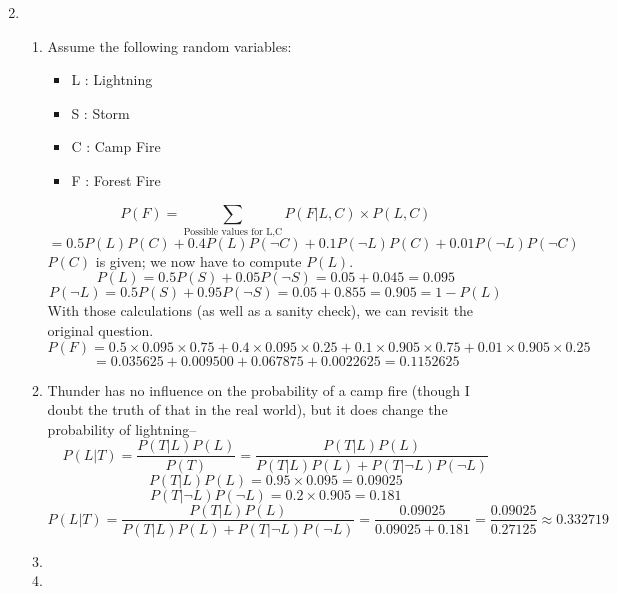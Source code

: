 \documentclass{article}
\begin{document}
\fancyhfoffset[L]{0cm}
\fancyhfoffset[R]{0cm}
\rhead{\today}

\begin{enumerate}
    \setcounter{enumi}{1}
    \item
    \begin{enumerate}
        \item
            Assume the following random variables:\\
            \begin{itemize}
                \item
                L : Lightning

                \item
                S : Storm

                \item
                C : Camp Fire

                \item
                F : Forest Fire
            \end{itemize}
            $$P(F) = \sum_{\text{Possible values for L,C}} P(F|L,C)\times P(L,C)$$
            $$ = 0.5P(L)P(C) + 0.4P(L)P(\neg C) + 0.1P(\neg L)P(C) + 0.01P(\neg L)P(\neg C)$$
            $P(C)$ is given; we now have to compute $P(L)$.
            $$P(L) = 0.5P(S) + 0.05P(\neg S) = 0.05 + 0.045 = 0.095$$
            $$P(\neg L) = 0.5P(S) + 0.95P(\neg S) = 0.05 + 0.855 = 0.905 = 1 - P(L)$$
            With those calculations (as well as a sanity check), we can revisit the original question.
            $$P(F) = 0.5\times0.095\times0.75 +
                0.4\times0.095\times0.25 + 
                0.1\times0.905\times0.75 +
                0.01\times0.905\times0.25$$
            $$ = 0.035625 + 0.009500 + 0.067875 + 0.0022625 = 0.1152625 $$

        \item
            Thunder has no influence on the probability of a camp fire (though I doubt the truth of that in the real world), but it does change the probability of lightning--
            $$P(L|T) = \frac{P(T|L)P(L)}{P(T)} = \frac{P(T|L)P(L)}{P(T|L)P(L) + P(T|\neg L)P(\neg L)}$$
            $$P(T|L)P(L) = 0.95 \times 0.095 = 0.09025$$
            $$P(T|\neg L)P(\neg L) = 0.2\times 0.905 = 0.181$$
            $$P(L|T) = \frac{P(T|L)P(L)}{P(T|L)P(L) + P(T|\neg L)P(\neg L)} = \frac{0.09025}{0.09025+0.181} = \frac{0.09025}{0.27125} \approx 0.332719$$

        \item

        \item

    \end{enumerate}
\end{enumerate}
\end{document}

